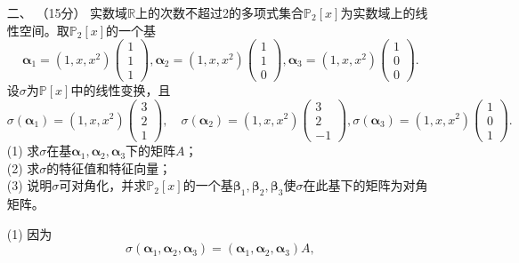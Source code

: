 \begin{enumerate}[1~]
\item[二、]（15分）
实数域$\mathbb{R}$上的次数不超过2的多项式集合$\mathbb{P}_2[x]$为实数域上的线性空间。取$\mathbb{P}_2[x]$的一个基\[
\boldsymbol{\alpha} _ { 1 } = \left( 1 , x , x ^ { 2 } \right) \left( \begin{array} { c } { 1 } \\ { 1 } \\ { 1 } \end{array} \right) ,  \boldsymbol{\alpha} _ { 2 } = \left( 1 , x , x ^ { 2 } \right) \left( \begin{array} { c } { 1 } \\ { 1 } \\ { 0 } \end{array} \right) ,  \boldsymbol{\alpha} _ { 3 } = \left( 1 , x , x ^ { 2 } \right) \left( \begin{array} { l } { 1 } \\ { 0 } \\ { 0 } \end{array} \right).
\]
设$\sigma$为$\mathbb{P}[x]$中的线性变换，且\[
\sigma \left( \boldsymbol{\alpha} _ { 1 } \right) = \left( 1 , x , x ^ { 2 } \right) \left( \begin{array} { c } { 3 } \\ { 2 } \\ { 1 } \end{array} \right) , \quad \sigma \left( \boldsymbol{\alpha} _ { 2 } \right) = \left( 1 , x , x ^ { 2 } \right) \left( \begin{array} { c } { 3 } \\ { 2 } \\ { - 1 } \end{array} \right) , \sigma \left( \boldsymbol{\alpha} _ { 3 } \right) = \left( 1 , x , x ^ { 2 } \right) \left( \begin{array} { c } { 1 } \\ { 0 } \\ { 1 } \end{array} \right).
\]
(1) 求$\sigma$在基$\boldsymbol{\alpha}_1, \boldsymbol{\alpha}_2, \boldsymbol{\alpha}_3$下的矩阵$A$；\\
(2) 求$\sigma$的特征值和特征向量；\\
(3) 说明$\sigma$可对角化，并求$\mathbb{P}_2[x]$的一个基$\boldsymbol{\beta}_1, \boldsymbol{\beta}_2, \boldsymbol{\beta}_3$使$\sigma$在此基下的矩阵为对角矩阵。
\begin{solution}
(1) 因为\[
\sigma(\boldsymbol{\alpha}_1, \boldsymbol{\alpha}_2, \boldsymbol{\alpha}_3)=(\boldsymbol{\alpha}_1, \boldsymbol{\alpha}_2, \boldsymbol{\alpha}_3)A,
\]
\end{solution}
\end{enumerate}
